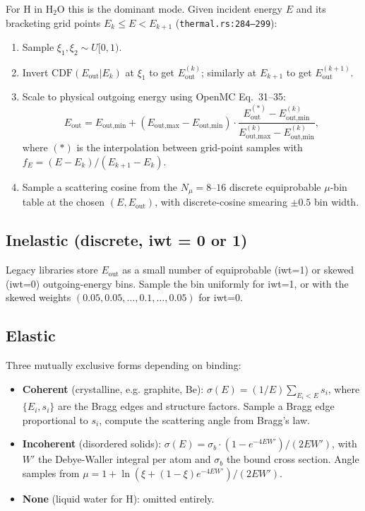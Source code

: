 \documentclass[11pt,a4paper]{article}
\begin{document}
For H in H$_2$O this is the dominant mode. Given incident energy
$E$ and its bracketing grid points $E_k \leq E < E_{k+1}$
(\texttt{thermal.rs:284--299}):
\begin{enumerate}
  \item Sample $\xi_1, \xi_2 \sim U[0,1)$.
  \item Invert $\text{CDF}(E_\text{out}|E_k)$ at $\xi_1$ to get
  $E^{(k)}_\text{out}$; similarly at $E_{k+1}$ to get
  $E^{(k+1)}_\text{out}$.
  \item Scale to physical outgoing energy using OpenMC Eq.~31--35:
  \begin{equation}
  E_\text{out} = E_\text{out,min} + (E_\text{out,max} - E_\text{out,min})
  \cdot \frac{E^{(*)}_\text{out} - E_\text{out,min}^{(k)}}
  {E_\text{out,max}^{(k)} - E_\text{out,min}^{(k)}},
  \end{equation}
  where $(*)$ is the interpolation between grid-point samples
  with $f_E = (E - E_k)/(E_{k+1} - E_k)$.
  \item Sample a scattering cosine from the $N_\mu = 8$--$16$
  discrete equiprobable $\mu$-bin table at the chosen
  $(E, E_\text{out})$, with discrete-cosine smearing $\pm 0.5$
  bin width.
\end{enumerate}

\subsection{Inelastic (discrete, iwt = 0 or 1)}

Legacy libraries store $E_\text{out}$ as a small number of
equiprobable (iwt=1) or skewed (iwt=0) outgoing-energy bins.
Sample the bin uniformly for iwt=1, or with the skewed weights
$(0.05, 0.05, \ldots, 0.1, \ldots, 0.05)$ for iwt=0.

\subsection{Elastic}

Three mutually exclusive forms depending on binding:
\begin{itemize}
  \item \textbf{Coherent} (crystalline, e.g. graphite, Be):
  $\sigma(E) = (1/E) \sum_{E_i < E} s_i$, where $\{E_i, s_i\}$
  are the Bragg edges and structure factors. Sample a Bragg
  edge proportional to $s_i$, compute the scattering angle
  from Bragg's law.
  \item \textbf{Incoherent} (disordered solids):
  $\sigma(E) = \sigma_b \cdot (1 - e^{-4 E W'})/(2 E W')$, with
  $W'$ the Debye-Waller integral per atom and $\sigma_b$ the
  bound cross section. Angle samples from
  $\mu = 1 + \ln(\xi + (1-\xi) e^{-4 E W'})/(2 E W')$.
  \item \textbf{None} (liquid water for H): omitted entirely.
\end{itemize}
\end{document}

